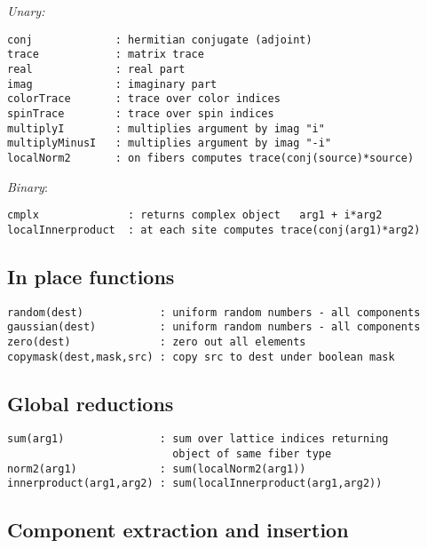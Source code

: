 \documentclass[12pt,letterpaper]{article}
\begin{document}
\noindent
{\em Unary:}

\begin{verbatim}
conj             : hermitian conjugate (adjoint)
trace            : matrix trace
real             : real part
imag             : imaginary part
colorTrace       : trace over color indices
spinTrace        : trace over spin indices
multiplyI        : multiplies argument by imag "i"
multiplyMinusI   : multiplies argument by imag "-i"
localNorm2       : on fibers computes trace(conj(source)*source)
\end{verbatim}


\noindent
{\em Binary}:

\begin{verbatim}
cmplx              : returns complex object   arg1 + i*arg2
localInnerproduct  : at each site computes trace(conj(arg1)*arg2)
\end{verbatim}

\subsection{In place functions}
\label{sec:inplace}

\begin{verbatim}
random(dest)            : uniform random numbers - all components
gaussian(dest)          : uniform random numbers - all components
zero(dest)              : zero out all elements
copymask(dest,mask,src) : copy src to dest under boolean mask
\end{verbatim}

\medskip


\subsection{Global reductions}
\label{sec:reductions}

\begin{verbatim}
sum(arg1)               : sum over lattice indices returning 
                          object of same fiber type
norm2(arg1)             : sum(localNorm2(arg1))
innerproduct(arg1,arg2) : sum(localInnerproduct(arg1,arg2))
\end{verbatim}

\medskip

\subsection{Component extraction and insertion}
\label{sec:peek}
\end{document}
